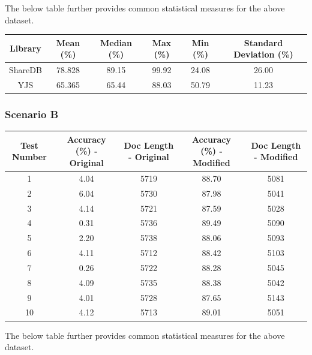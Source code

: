 \documentclass[9pt, titlepage]{article}
\begin{document}
  The below table further provides common statistical measures for the above dataset.\\

  \begin{center}
    \begin{tabular}{||c c c c c c||} 
      \hline
      Library & Mean (\%) & Median (\%) & Max (\%) & Min (\%) & Standard Deviation (\%) \\ [0.5ex] 
      \hline\hline
      ShareDB & 78.828 & 89.15 & 99.92 & 24.08 & 26.00 \\ 
      \hline
      YJS & 65.365 & 65.44 & 88.03 & 50.79 & 11.23 \\
      \hline
    \end{tabular}
  \end{center}
  \hfill

  \subsubsection{Scenario B}
  
  \begin{center}
    \begin{tabular}{||c c c c c||} 
      \hline
      Test Number & Accuracy (\%) - Original & Doc Length - Original & Accuracy (\%) - Modified & Doc Length - Modified \\ [0.5ex] 
      \hline\hline
      1 &  4.04 & 5719 & 88.70 & 5081 \\ 
      \hline
      2 &  6.04 & 5730 & 87.98 & 5041 \\ 
      \hline
      3 &  4.14 & 5721 & 87.59 & 5028 \\ 
      \hline
      4 &  0.31 & 5736 & 89.49 & 5090 \\ 
      \hline
      5 &  2.20 & 5738 & 88.06 & 5093 \\ 
      \hline
      6 &  4.11 & 5712 & 88.42 & 5103 \\ 
      \hline
      7 &  0.26 & 5722 & 88.28 & 5045 \\ 
      \hline
      8 &  4.09 & 5735 & 88.38 & 5042 \\ 
      \hline
      9 &  4.01 & 5728 & 87.65 & 5143 \\ 
      \hline
      10 & 4.12 & 5713 & 89.01 & 5051 \\ 
      \hline
    \end{tabular}
  \end{center}
  
  The below table further provides common statistical measures for the above dataset.\\
\end{document}
